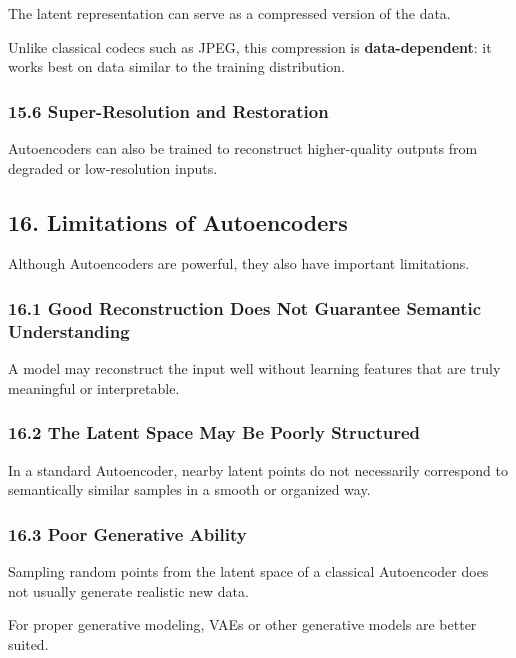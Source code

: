\documentclass[
  italian,
  11pt,
]{article}
\begin{document}
The latent representation can serve as a compressed version of the data.

Unlike classical codecs such as JPEG, this compression is
\textbf{data-dependent}: it works best on data similar to the training
distribution.

\subsubsection{15.6 Super-Resolution and
Restoration}\label{super-resolution-and-restoration}

Autoencoders can also be trained to reconstruct higher-quality outputs
from degraded or low-resolution inputs.

\subsection{16. Limitations of
Autoencoders}\label{limitations-of-autoencoders}

Although Autoencoders are powerful, they also have important
limitations.

\subsubsection{16.1 Good Reconstruction Does Not Guarantee Semantic
Understanding}\label{good-reconstruction-does-not-guarantee-semantic-understanding}

A model may reconstruct the input well without learning features that
are truly meaningful or interpretable.

\subsubsection{16.2 The Latent Space May Be Poorly
Structured}\label{the-latent-space-may-be-poorly-structured}

In a standard Autoencoder, nearby latent points do not necessarily
correspond to semantically similar samples in a smooth or organized way.

\subsubsection{16.3 Poor Generative
Ability}\label{poor-generative-ability}

Sampling random points from the latent space of a classical Autoencoder
does not usually generate realistic new data.

For proper generative modeling, VAEs or other generative models are
better suited.
\end{document}
